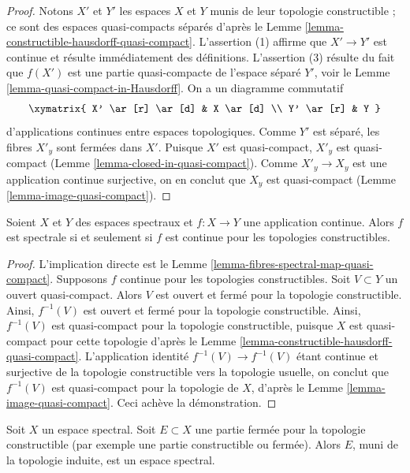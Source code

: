 \begin{proof}
Notons $X'$ et $Y'$ les espaces $X$ et $Y$ munis de leur topologie
constructible ; ce sont des espaces quasi-compacts séparés d'après le
Lemme \ref{lemma-constructible-hausdorff-quasi-compact}.
L'assertion (1) affirme que $X' \to Y'$ est continue et résulte immédiatement
des définitions. L'assertion (3) résulte du fait que $f(X')$ est une partie
quasi-compacte de l'espace séparé $Y'$, voir le
Lemme \ref{lemma-quasi-compact-in-Hausdorff}.
On a un diagramme commutatif
$$
\xymatrix{
X' \ar[r] \ar[d] & X \ar[d] \\
Y' \ar[r] & Y
}
$$
d'applications continues entre espaces topologiques. Comme $Y'$ est séparé,
les fibres $X'_y$ sont fermées dans $X'$. Puisque $X'$ est quasi-compact,
$X'_y$ est quasi-compact
(Lemme \ref{lemma-closed-in-quasi-compact}).
Comme $X'_y \to X_y$ est une application continue surjective, on en conclut
que $X_y$ est quasi-compact (Lemme \ref{lemma-image-quasi-compact}).
\end{proof}

\begin{lemma}
\label{lemma-spectral-if-continuous-wrt-constructible-top}
Soient $X$ et $Y$ des espaces spectraux et $f : X \to Y$ une application
continue. Alors $f$ est spectrale si et seulement si $f$ est continue pour
les topologies constructibles.
\end{lemma}

\begin{proof}
L'implication directe est le
Lemme \ref{lemma-fibres-spectral-map-quasi-compact}.
Supposons $f$ continue pour les topologies constructibles.
Soit $V \subset Y$ un ouvert quasi-compact.
Alors $V$ est ouvert et fermé pour la topologie constructible.
Ainsi, $f^{-1}(V)$ est ouvert et fermé pour la topologie constructible.
Ainsi, $f^{-1}(V)$ est quasi-compact pour la topologie constructible, puisque
$X$ est quasi-compact pour cette topologie d'après le
Lemme \ref{lemma-constructible-hausdorff-quasi-compact}.
L'application identité $f^{-1}(V) \to f^{-1}(V)$ étant continue et surjective
de la topologie constructible vers la topologie usuelle, on conclut que
$f^{-1}(V)$ est quasi-compact pour la topologie de $X$, d'après le
Lemme \ref{lemma-image-quasi-compact}.
Ceci achève la démonstration.
\end{proof}

\begin{lemma}
\label{lemma-spectral-sub}
Soit $X$ un espace spectral. Soit $E \subset X$ une partie fermée pour la
topologie constructible (par exemple une partie constructible ou fermée).
Alors $E$, muni de la topologie induite, est un espace spectral.
\end{lemma}

